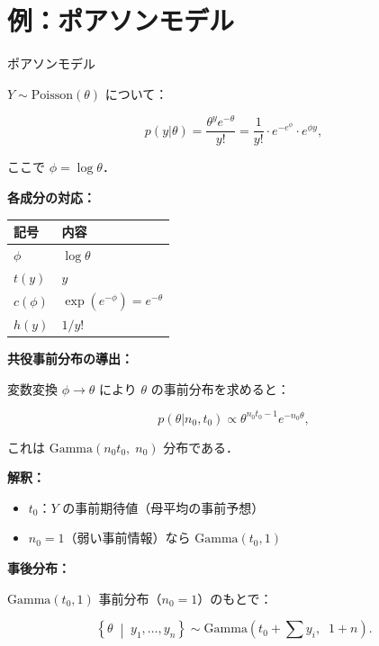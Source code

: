 \documentclass[lualatex,ja=standard,a4paper,12pt]{bxjsarticle}
\begin{document}
\section{例：ポアソンモデル}

\begin{exbox}{ポアソンモデル}

$Y \sim \mathrm{Poisson}(\theta)$ について：

\[
  p(y|\theta) = \frac{\theta^y e^{-\theta}}{y!}
  = \frac{1}{y!} \cdot e^{-e^\phi} \cdot e^{\phi y},
\]

ここで $\phi = \log\theta$．

\medskip
\noindent\textbf{各成分の対応：}

\medskip
\begin{center}
\begin{tabular}{ll}
\toprule
記号 & 内容 \\
\midrule
$\phi$ & $\log\theta$ \\
$t(y)$ & $y$ \\
$c(\phi)$ & $\exp(e^{-\phi}) = e^{-\theta}$ \\
$h(y)$ & $1/y!$ \\
\bottomrule
\end{tabular}
\end{center}

\medskip
\noindent\textbf{共役事前分布の導出：}

変数変換 $\phi \to \theta$ により $\theta$ の事前分布を求めると：

\[
  p(\theta|n_0, t_0) \propto \theta^{n_0 t_0 - 1} e^{-n_0 \theta},
\]

これは $\mathrm{Gamma}(n_0 t_0,\; n_0)$ 分布である．

\medskip
\noindent\textbf{解釈：}
\begin{itemize}
  \item $t_0$：$Y$ の事前期待値（母平均の事前予想）
  \item $n_0 = 1$（弱い事前情報）なら $\mathrm{Gamma}(t_0, 1)$
\end{itemize}

\medskip
\noindent\textbf{事後分布：}

$\mathrm{Gamma}(t_0, 1)$ 事前分布（$n_0=1$）のもとで：

\[
  \left\{\theta\;\middle|\; y_1,\ldots,y_n\right\}
  \sim \mathrm{Gamma}\!\left(t_0 + \sum y_i,\;\; 1 + n\right).
\]

\end{exbox}
\end{document}
